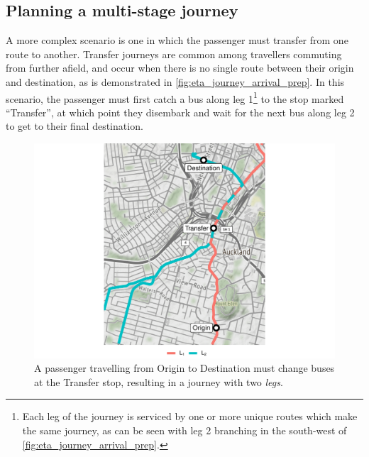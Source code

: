 \subsection{Planning a multi-stage journey}
\label{sec:journey_transfer}

A more complex scenario is one in which the passenger must transfer from one route to another. Transfer journeys are common among travellers commuting from further afield, and occur when there is no single route between their origin and destination, as is demonstrated in \cref{fig:eta_journey_arrival_prep}. In this scenario, the passenger must first catch a bus along leg 1\footnote{Each leg of the journey is serviced by one or more unique routes which make the same journey, as can be seen with leg 2 branching in the south-west of \cref{fig:eta_journey_arrival_prep}.} to the stop marked ``Transfer'', at which point they disembark and wait for the next bus along leg 2 to get to their final destination.


\begin{knitrout}\small
{}\color{fgcolor}\begin{figure}

{\centering \includegraphics[width=\textwidth]{figure/eta_journey_transfer_prep-1} 

}

\caption[A transfer journey for a passenger travelling between two locations with no single connecting route.]{A passenger travelling from Origin to Destination must change buses at the Transfer stop, resulting in a journey with two \emph{legs}.}\label{fig:eta_journey_transfer_prep}
\end{figure}


\end{knitrout}



